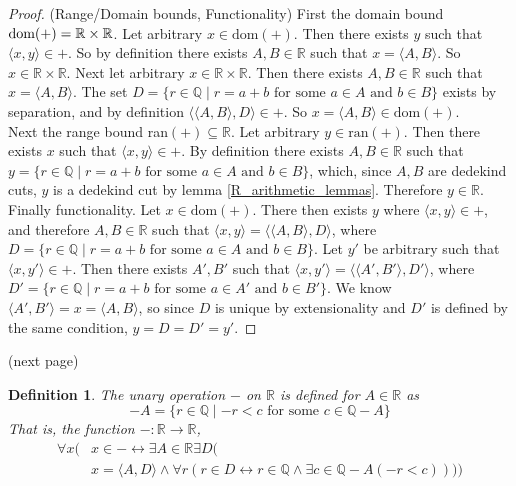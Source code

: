 \documentclass{report}
\newtheorem{definition}[theo]{Definition}
\begin{document}
\begin{proof}(Range/Domain bounds, Functionality)
First the domain bound $\text{dom}(+)\\=\mathbb R\times\mathbb R$.
Let arbitrary $x\in\text{dom}(+)$. Then there exists $y$ such that $\langle x,y\rangle\in+$.
So by definition there exists $A,B\in\mathbb R$ such that $x=\langle A,B\rangle$. So $x\in\mathbb R\times\mathbb R$. 
Next let arbitrary $x\in\mathbb R\times\mathbb R$. Then there exists $A,B\in\mathbb R$ such that $x=\langle A,B\rangle$.
The set $D=\{r\in\mathbb Q\mid r=a+b\text{ for some $a\in A$ and $b\in B$}\}$ exists by separation, and by definition
$\langle\langle A,B\rangle,D\rangle\in+$. So $x=\langle A,B\rangle\in\text{dom}(+)$.\\
\indent Next the range bound ran$(+)\subseteq\mathbb R$. Let arbitrary $y\in\text{ran}(+)$. Then there exists $x$ such that 
$\langle x,y\rangle\in+$. By definition there exists $A,B\in\mathbb R$ such that 
$y=\{r\in\mathbb Q\mid r=a+b\text{ for some $a\in A$ and $b\in B$}\}$, which, since $A,B$ are dedekind cuts, $y$ is a dedekind cut by 
lemma \ref{R_arithmetic_lemmas}. Therefore $y\in\mathbb R$.\\
\indent Finally functionality. Let $x\in\text{dom}(+)$. There then exists $y$ where $\langle x,y\rangle\in+$, and therefore $A,B\in\mathbb R$ 
such that $\langle x,y\rangle=\langle\langle A,B\rangle,D\rangle$, where $D=\{r\in\mathbb Q\mid r=a+b\text{ for some $a\in A$ and $b\in B$}\}$. 
Let $y'$ be arbitrary such that $\langle x,y'\rangle\in+$. Then there exists $A',B'$ such that 
$\langle x,y'\rangle=\langle\langle A',B'\rangle,D'\rangle$, where $D'=\{r\in\mathbb Q\mid r=a+b\text{ for some $a\in A'$ and $b\in B'$}\}$.
We know $\langle A',B'\rangle=x=\langle A,B\rangle$, so since $D$ is unique by extensionality and $D'$ is defined by the same condition, 
$y=D=D'=y'$.
\end{proof}
\noindent(next page)\newpage
\begin{definition}
The unary operation $-$ on $\mathbb R$ is defined for $A\in\mathbb R$ as
\begin{equation*}
-A=\{r\in\mathbb Q\mid-r<c\text{ for some }c\in\mathbb Q-A\}
\end{equation*}
That is, the function $-:\mathbb R\to\mathbb R$,
\begin{align*}
\forall x(&x\in-\leftrightarrow\exists A\in\mathbb R\exists D(\\
&x=\langle A,D\rangle\land\forall r(r\in D\leftrightarrow r\in\mathbb Q\land\exists c\in\mathbb Q-A(-r<c))))
\end{align*}
\end{definition}
\end{document}
